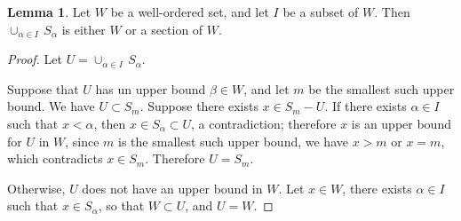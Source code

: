 \documentclass[11pt,a4paper,twoside]{article}
\theoremstyle{definition}
\newtheorem{lemma}{Lemma}
\begin{document}
\bigskip
\begin{lemma}\label{lemma:union_of_sections}
  Let $W$ be a well-ordered set, and let $I$ be a subset of $W$. Then $\cup_{\alpha \in I} \,S_\alpha$ is
  either $W$ or a section of $W$.
\end{lemma}

\begin{proof}
  Let $U = \cup_{\alpha \in I} \,S_\alpha$.

  Suppose that $U$ has un upper bound $\beta \in W$, and let $m$ be the smallest such upper bound.
  We have $U \subset S_m$. Suppose there exists $x \in S_m - U$. If there exists $\alpha \in I$
  such that $x < \alpha$, then $x \in S_\alpha \subset U$, a contradiction; therefore $x$ is an upper bound
  for $U$ in $W$, since $m$ is the smallest such upper bound, we have $x > m$ or $x = m$,
  which contradicts $x \in S_m$. Therefore $U = S_m$.

  Otherwise, $U$ does not have an upper bound in $W$. Let $x \in W$, there exists $\alpha \in I$ such
  that $x \in S_\alpha$, so that $W \subset U$, and $U = W$.
\end{proof}
\end{document}
